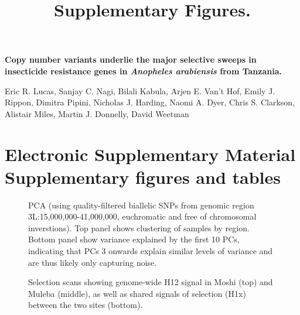 \documentclass[a4paper,12pt]{article}
\title{Supplementary Figures.}
\begin{document}
\onehalfspacing

\begin{center}
	\Large
	\noindent \textbf{Copy number variants underlie the major selective sweeps in insecticide resistance genes in \textit{Anopheles arabiensis} from Tanzania.}

	\normalsize

	\vskip 3cm

\end{center}

\noindent Eric R. Lucas, Sanjay C. Nagi, Bilali Kabula, Arjen E. Van’t Hof, Emily J. Rippon, Dimitra Pipini, Nicholas J. Harding, Naomi A. Dyer, Chris S. Clarkson, Alistair Miles, Martin J. Donnelly, David Weetman
 

 
\vskip 2cm 


\section*{Electronic Supplementary Material \\ Supplementary figures and tables}

\clearpage

\begin{figure}[h]
	\begin{center}
		\vskip 0.4cm
	\caption{\footnotesize PCA (using quality-filtered biallelic SNPs from genomic region 3L:15,000,000-41,000,000, euchromatic and free of chromosomal inverstions). Top panel shows clustering of samples by region. Bottom panel show variance explained by the first 10 PCs, indicating that PCs 3 onwards explain similar levels of variance and are thus likely only capturing noise.}
	\end{center}
	\label{FigS1}
\end{figure}


\clearpage


\begin{figure}[h]
	\begin{center}
		\vskip 0.4cm
		\vskip 0.4cm
	\end{center}
	\caption{\footnotesize Selection scans showing genome-wide H12 signal in Moshi (top) and Muleba (middle), as well as shared signals of selection (H1x) between the two sites (bottom).}
	\label{FigS2}
\end{figure}
\end{document}

